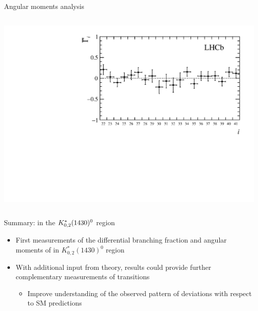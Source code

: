 \documentclass[aspectratio=1610]{beamer}
\def\Kstarfourteenthirty  {{\ensuremath{\kaon^{*}_{0,2}(1430)^{0}}}\xspace}
\begin{document}
\begin{frame}{Angular moments analysis}
\begin{columns}
\begin{column}{0.45\textwidth}
\includegraphics[height=0.44\textheight]{figs/kpimm/angular-analysis/mom_results_22_41.pdf}
\end{column}
\end{columns}
\end{frame}

\begin{frame}{Summary: \BdToKpimm in the \Kstarfourteenthirty region}

\begin{itemize}
  \item[\ding{80}] First measurements of the differential branching fraction and angular moments of \BdToKpimm in $K^{*}_{0,2}(1430)^{0}$ region
  \item[\ding{80}] With additional input from theory, results could provide further complementary measurements of \decay{\bquark}{\squark\mup\mun} transitions
  \begin{itemize}
    \item[\ding{70}] Improve understanding of the observed pattern of deviations with respect to SM predictions
  \end{itemize}
\end{itemize}

\end{frame}

\appendix
\end{document}
